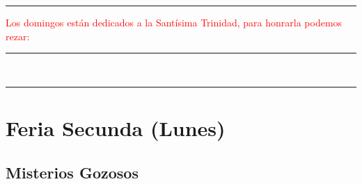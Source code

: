 \documentclass[10pt,twoside]{book}
\begin{document}


\vspace{0.75em}





\vspace{0.75em}





\vspace{0.75em}





\iralfinal

\begin{center}
      {\rule{10em}{0.4pt}}

      \vspace{0.75em}

      \textcolor{red}{Los domingos están dedicados a la Santísima Trinidad, para honrarla podemos rezar:}
\end{center}

\begin{multicols}{2}

      
      
\end{multicols}

\begin{center}
      \begin{spacing}{0.25}
            {\rule{20em}{0.4pt}}\\
            {\rule{20em}{0.4pt}}
      \end{spacing}
\end{center}


\section*{\centering Feria Secunda (Lunes)}

\noindent\subsection*{Misterios Gozosos}
\end{document}
